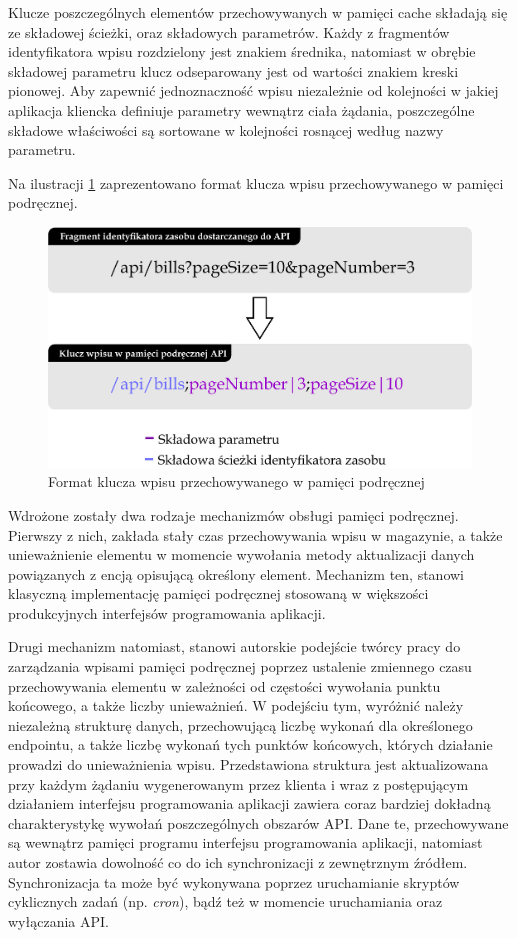 Klucze poszczególnych elementów przechowywanych w pamięci cache składają się ze składowej ścieżki, oraz składowych parametrów. Każdy z fragmentów identyfikatora wpisu rozdzielony jest znakiem średnika, natomiast w obrębie składowej parametru klucz odseparowany jest od wartości znakiem kreski pionowej. Aby zapewnić jednoznaczność wpisu niezależnie od kolejności w jakiej aplikacja kliencka definiuje parametry wewnątrz ciała żądania, poszczególne składowe właściwości są sortowane w kolejności rosnącej według nazwy parametru.

Na ilustracji \ref{fig:cache-klucz} zaprezentowano format klucza wpisu przechowywanego w pamięci podręcznej.

\begin{figure}[ht]
    \centering
     \includegraphics[width=0.8\linewidth]{rys04/cache-klucz.png}
    \caption{Format klucza wpisu przechowywanego w pamięci podręcznej}
    \label{fig:cache-klucz}
\end{figure}

Wdrożone zostały dwa rodzaje mechanizmów obsługi pamięci podręcznej. Pierwszy z nich, zakłada stały czas przechowywania wpisu w magazynie, a także unieważnienie elementu w momencie wywołania metody aktualizacji danych powiązanych z encją opisującą określony element. Mechanizm ten, stanowi klasyczną implementację pamięci podręcznej stosowaną w większości produkcyjnych interfejsów programowania aplikacji.

Drugi mechanizm natomiast, stanowi autorskie podejście twórcy pracy do zarządzania wpisami pamięci podręcznej poprzez ustalenie zmiennego czasu przechowywania elementu w zależności od częstości wywołania punktu końcowego, a także liczby unieważnień. W podejściu tym, wyróżnić należy niezależną strukturę danych, przechowującą liczbę wykonań dla określonego endpointu, a także liczbę wykonań tych punktów końcowych, których działanie prowadzi do unieważnienia wpisu. Przedstawiona struktura jest aktualizowana przy każdym żądaniu wygenerowanym przez klienta i wraz z postępującym działaniem interfejsu programowania aplikacji zawiera coraz bardziej dokładną charakterystykę wywołań poszczególnych obszarów API. Dane te, przechowywane są wewnątrz pamięci programu interfejsu programowania aplikacji, natomiast autor zostawia dowolność co do ich synchronizacji z zewnętrznym źródłem. Synchronizacja ta może być wykonywana poprzez uruchamianie skryptów cyklicznych zadań (np. \textit{cron}), bądź też w momencie uruchamiania oraz wyłączania API.


